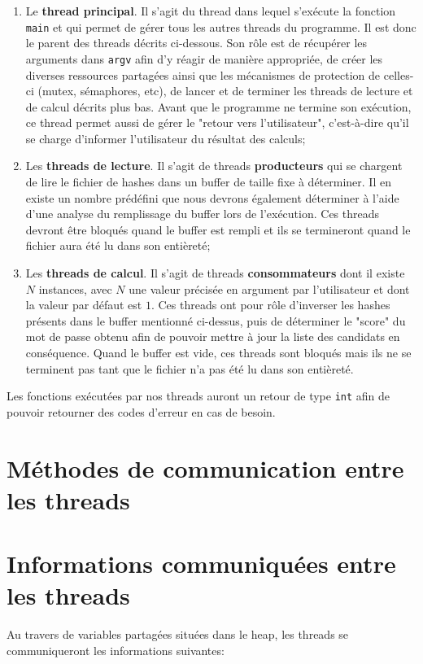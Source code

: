 \documentclass{article}
\begin{document}
	\begin{enumerate}
		\item
		Le \textbf{thread principal}.
		Il s'agit du thread dans lequel s'exécute la fonction \lstinline{main} et qui permet de gérer tous les autres threads du programme.
		Il est donc le parent des threads décrits ci-dessous.
		Son rôle est de récupérer les arguments dans \lstinline{argv} afin d'y réagir de manière appropriée, de créer les diverses ressources partagées ainsi que les mécanismes de protection de celles-ci (mutex, sémaphores, etc), de lancer et de terminer les threads de lecture et de calcul décrits plus bas.
		Avant que le programme ne termine son exécution, ce thread permet aussi de gérer le "retour vers l'utilisateur", c'est-à-dire qu'il se charge d'informer l'utilisateur du résultat des calculs;
		
		\item
		Les \textbf{threads de lecture}.
		Il s'agit de threads \textbf{producteurs} qui se chargent de lire le fichier de hashes dans un buffer de taille fixe à déterminer.
		Il en existe un nombre prédéfini que nous devrons également déterminer à l'aide d'une analyse du remplissage du buffer lors de l'exécution.
		Ces threads devront être bloqués quand le buffer est rempli et ils se termineront quand le fichier aura été lu dans son entièreté;
		
		\item
		Les \textbf{threads de calcul}.
		Il s'agit de threads \textbf{consommateurs} dont il existe $N$ instances, avec $N$ une valeur précisée en argument par l'utilisateur et dont la valeur par défaut est $1$.
		Ces threads ont pour rôle d'inverser les hashes présents dans le buffer mentionné ci-dessus, puis de déterminer le "score" du mot de passe obtenu afin de pouvoir mettre à jour la liste des candidats en conséquence.
		Quand le buffer est vide, ces threads sont bloqués mais ils ne se terminent pas tant que le fichier n'a pas été lu dans son entièreté.
	\end{enumerate}
	
	\noindent
	Les fonctions exécutées par nos threads auront un retour de type \lstinline{int} afin de pouvoir retourner des codes d'erreur en cas de besoin.

\section{Méthodes de communication entre les threads}

\section{Informations communiquées entre les threads}
	Au travers de variables partagées situées dans le heap, les threads se communiqueront les informations suivantes:
	
\end{document}
